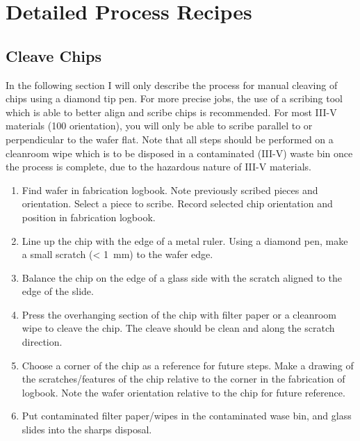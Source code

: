 \section{Detailed Process Recipes}
\subsection{Cleave Chips}
\label{sec:cleave}
In the following section I will only describe the process for manual cleaving of chips using a diamond tip pen.
For more precise jobs, the use of a scribing tool which is able to better align and scribe chips is recommended.
For most III-V materials (100 orientation), you will only be able to scribe parallel to or perpendicular to the wafer flat.
Note that all steps should be performed on a cleanroom wipe which is to be disposed in a contaminated (III-V) waste bin
once the process is complete, due to the hazardous nature of III-V materials.
\begin{enumerate}
    \item Find wafer in fabrication logbook. Note previously scribed pieces and orientation. Select a piece to scribe. Record selected chip orientation and position in fabrication logbook.
    \item Line up the chip with the edge of a metal ruler. Using a diamond pen, make a small scratch (< \SI{1}{\milli\meter}) to the wafer edge.
    \item Balance the chip on the edge of a glass side with the scratch aligned to the edge of the slide.
    \item Press the overhanging section of the chip with filter paper or a cleanroom wipe to cleave the chip. The cleave should be clean and along the scratch direction.
    \item Choose a corner of the chip as a reference for future steps. Make a drawing of the scratches/features of the chip relative to the corner in the fabrication of logbook. Note the wafer orientation relative to the chip for future reference.
    \item Put contaminated filter paper/wipes in the contaminated wase bin, and glass slides into the sharps disposal.
\end{enumerate}

